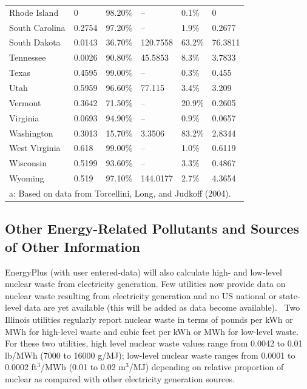 \begin{longtable}[c]{p{1.0in}p{1.0in}p{1.0in}p{1.0in}p{1.0in}p{1.0in}}
Rhode Island & 0 & 98.20\% & -- & 0.1\% & 0 \tabularnewline
South Carolina & 0.2754 & 97.20\% & -- & 1.9\% & 0.2677 \tabularnewline
South Dakota & 0.0143 & 36.70\% & 120.7558 & 63.2\% & 76.3811 \tabularnewline
Tennessee & 0.0026 & 90.80\% & 45.5853 & 8.3\% & 3.7833 \tabularnewline
Texas & 0.4595 & 99.00\% & -- & 0.3\% & 0.455 \tabularnewline
Utah & 0.5959 & 96.60\% & 77.115 & 3.4\% & 3.209 \tabularnewline
Vermont & 0.3642 & 71.50\% & -- & 20.9\% & 0.2605 \tabularnewline
Virginia & 0.0693 & 94.90\% & -- & 0.9\% & 0.0657 \tabularnewline
Washington & 0.3013 & 15.70\% & 3.3506 & 83.2\% & 2.8344 \tabularnewline
West Virginia & 0.618 & 99.00\% & -- & 1.0\% & 0.6119 \tabularnewline
Wisconsin & 0.5199 & 93.60\% & -- & 3.3\% & 0.4867 \tabularnewline
Wyoming & 0.519 & 97.10\% & 144.0177 & 2.7\% & 4.3654 \tabularnewline
\midrule
\multicolumn{6}{l}{a: Based on data from Torcellini, Long, and Judkoff (2004).} \tabularnewline
\bottomrule
\end{longtable}

\subsection{Other Energy-Related Pollutants and Sources of Other Information}\label{other-energy-related-pollutants-and-sources-of-other-information}

EnergyPlus (with user entered-data) will also calculate high- and low-level nuclear waste from electricity generation. Few utilities now provide data on nuclear waste resulting from electricity generation and no US national or state-level data are yet available (this will be added as data become available).~ Two Illinois utilities regularly report nuclear waste in terms of pounds per kWh or MWh for high-level waste and cubic feet per kWh or MWh for low-level waste.~ For these two utilities, high level nuclear waste values range from 0.0042 to 0.01 lb/MWh (7000 to 16000 g/MJ); low-level nuclear waste ranges from 0.0001 to 0.0002 ft\(^{3}\)/MWh (0.01 to 0.02 m\(^{3}\)/MJ) depending on relative proportion of nuclear as compared with other electricity generation sources.

